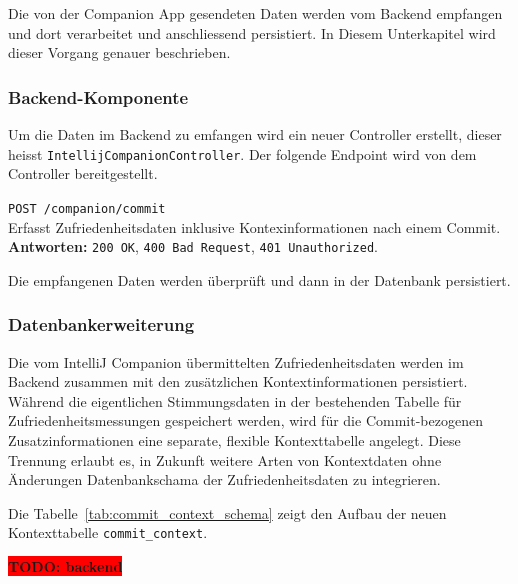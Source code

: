 \documentclass[12pt,a4paper]{report}
\newcommand{\todo}[1]{\colorbox{red}{\textbf{TODO: #1}}\\}
\begin{document}
Die von der Companion App gesendeten Daten werden vom Backend empfangen und dort verarbeitet und anschliessend persistiert. In
Diesem Unterkapitel wird dieser Vorgang genauer beschrieben.

\subsubsection{Backend-Komponente}

Um die Daten im Backend zu emfangen wird ein neuer Controller erstellt, dieser heisst \texttt{IntellijCompanionController}. Der
folgende Endpoint wird von dem Controller bereitgestellt.

\begin{description}
  \item \texttt{POST /companion/commit} \\
        Erfasst Zufriedenheitsdaten inklusive Kontexinformationen nach einem Commit. \\
        \textbf{Antworten:} \texttt{200 OK}, \texttt{400 Bad Request}, \texttt{401 Unauthorized}.
\end{description}

Die empfangenen Daten werden überprüft und dann in der Datenbank persistiert.

\subsubsection{Datenbankerweiterung}

Die vom IntelliJ Companion übermittelten Zufriedenheitsdaten werden im Backend zusammen mit den zusätzlichen Kontextinformationen
persistiert. Während die eigentlichen Stimmungsdaten in der bestehenden Tabelle für Zufriedenheitsmessungen gespeichert werden,
wird für die Commit-bezogenen Zusatzinformationen eine separate, flexible Kontexttabelle angelegt. Diese Trennung erlaubt es, in
Zukunft weitere Arten von Kontextdaten ohne Änderungen Datenbankschama der Zufriedenheitsdaten zu integrieren.

Die Tabelle~\ref{tab:commit_context_schema} zeigt den Aufbau der neuen Kontexttabelle \texttt{commit_context}.

\todo{backend}

\printbibliography
\end{document}
